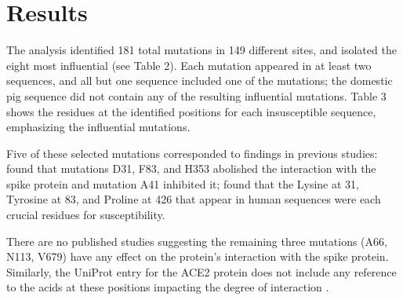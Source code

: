 \section{Results}

The analysis identified 181 total mutations in 149 different sites, and isolated the eight most influential (see Table 2). Each mutation appeared in at least two sequences, and all but one sequence included one of the mutations; the domestic pig sequence did not contain any of the resulting influential mutations. Table 3 shows the residues at the identified positions for each insusceptible sequence, emphasizing the influential mutations.




Five of these selected mutations corresponded to findings in previous studies: \textcite{Li} found that mutations D31, F83, and H353 abolished the interaction with the spike protein and mutation A41 inhibited it; \textcite{Lee} found that the Lysine at 31, Tyrosine at 83, and Proline at 426 that appear in human sequences were each crucial residues for susceptibility.

There are no published studies suggesting the remaining three mutations (A66, N113, V679) have any effect on the protein's interaction with the spike protein. Similarly, the UniProt entry for the ACE2 protein does not include any reference to the acids at these positions impacting the degree of interaction \cite{UniProt}.


